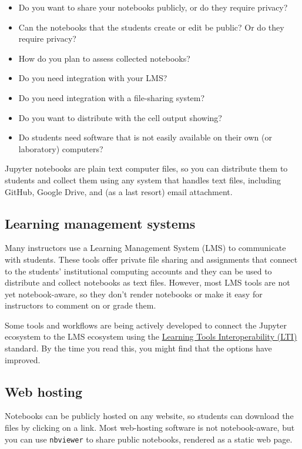 \documentclass[]{book}
\begin{document}
\begin{itemize}
\item
  Do you want to share your notebooks publicly, or do they require
  privacy?
\item
  Can the notebooks that the students create or edit be public? Or do
  they require privacy?
\item
  How do you plan to assess collected notebooks?
\item
  Do you need integration with your LMS?
\item
  Do you need integration with a file-sharing system?
\item
  Do you want to distribute with the cell output showing?
\item
  Do students need software that is not easily available on their own
  (or laboratory) computers?
\end{itemize}

Jupyter notebooks are plain text computer files, so you can distribute
them to students and collect them using any system that handles text
files, including GitHub, Google Drive, and (as a last resort) email
attachment.

\subsection{Learning management
systems}\label{learning-management-systems}

Many instructors use a Learning Management System (LMS) to communicate
with students. These tools offer private file sharing and assignments
that connect to the students' institutional computing accounts and they
can be used to distribute and collect notebooks as text files. However,
most LMS tools are not yet notebook-aware, so they don't render
notebooks or make it easy for instructors to comment on or grade them.

Some tools and workflows are being actively developed to connect the
Jupyter ecosystem to the LMS ecosystem using the
\href{https://open.edx.org/learning-tools-interoperability}{Learning
Tools Interoperability (LTI)} standard. By the time you read this, you
might find that the options have improved.

\subsection{Web hosting}\label{web-hosting}

Notebooks can be publicly hosted on any website, so students can
download the files by clicking on a link. Most web-hosting software is
not notebook-aware, but you can use \texttt{nbviewer} to share public
notebooks, rendered as a static web page.
\end{document}
